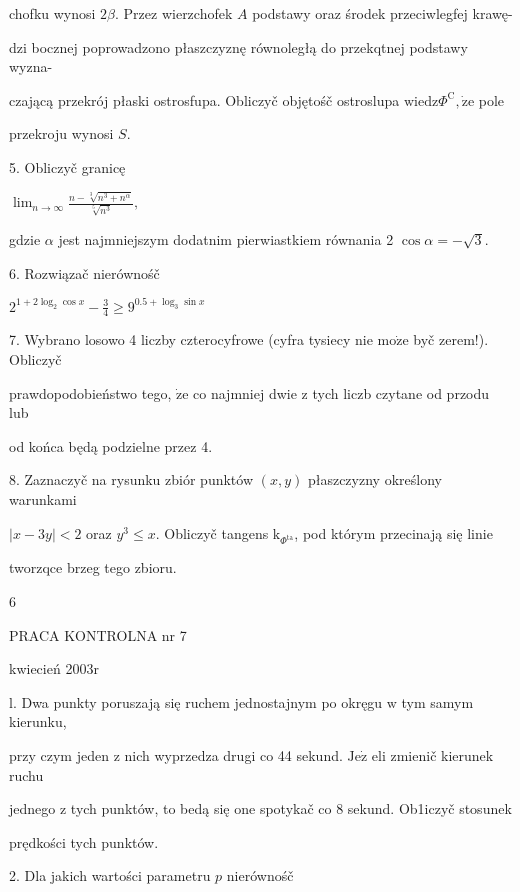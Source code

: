 \documentclass[a4paper,12pt]{article}
\begin{document}
chofku wynosi $ 2\beta$. Przez wierzchofek $A$ podstawy oraz środek przeciwlegfej krawę-

dzi bocznej poprowadzono płaszczyznę równoległą do przekqtnej podstawy wyzna-

czającą przekrój płaski ostrosfupa. Obliczyč objętośč ostroslupa $\mathrm{w}\mathrm{i}\mathrm{e}\mathrm{d}\mathrm{z}\Phi^{\mathrm{C}}, \dot{\mathrm{z}}\mathrm{e}$ pole

przekroju wynosi $S.$

5. Obliczyč granicę

$\displaystyle \lim_{n\rightarrow\infty}\frac{n-\sqrt[3]{n^{3}+n^{\alpha}}}{\sqrt[5]{n^{3}}},$

gdzie $\alpha$ jest najmniejszym dodatnim pierwiastkiem równania 2 $\cos\alpha=-\sqrt{3}.$

6. Rozwiązač nierównośč

$2^{1+2\log_{2}\cos x}-\displaystyle \frac{3}{4}\geq 9^{0.5+\log_{3}\sin x}$

7. Wybrano losowo 4 liczby czterocyfrowe (cyfra tysiecy nie $\mathrm{m}\mathrm{o}\dot{\mathrm{z}}\mathrm{e}$ byč zerem!). Obliczyč

prawdopodobieństwo tego, $\dot{\mathrm{z}}\mathrm{e}$ co najmniej dwie $\mathrm{z}$ tych liczb czytane od przodu lub

od końca będą podzielne przez 4.

8. Zaznaczyč na rysunku zbiór punktów $(x,y)$ płaszczyzny określony warunkami

$|x-3y| <2$ oraz $y^{3}\leq x$. Obliczyč tangens $\mathrm{k}_{\Phi^{\mathrm{t}\mathrm{a}}}$, pod którym przecinają się linie

tworzqce brzeg tego zbioru.

6





PRACA KONTROLNA nr 7

kwiecień 2003r

l. Dwa punkty poruszają się ruchem jednostajnym po okręgu $\mathrm{w}$ tym samym kierunku,

przy czym jeden $\mathrm{z}$ nich wyprzedza drugi co 44 sekund. $\mathrm{J}\mathrm{e}\dot{\mathrm{z}}$ eli zmienič kierunek ruchu

jednego $\mathrm{z}$ tych punktów, to bedą się one spotykač co 8 sekund. Ob1iczyč stosunek

prędkości tych punktów.

2. Dla jakich wartości parametru $p$ nierównośč
\end{document}
